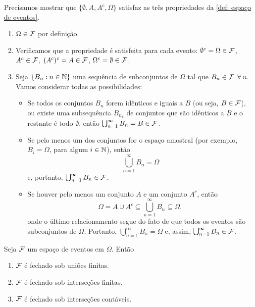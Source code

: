 \begin{solution}
Precisamos mostrar que $\{ \emptyset, A, A^c, \Omega\}$ satisfaz as três propriedades da \ref{def: espaço de eventos}.
\begin{enumerate}
[$ (i) $]
\item $\Omega\in\mathcal F$ por definição.
\item Verificamos que a propriedade é satisfeita para cada evento:  $\emptyset^c=\Omega \in \mathcal F$, $A^c \in \mathcal F$, $(A^c)^c=A \in \mathcal F$,
$\Omega^c=\emptyset \in \mathcal F$.
\item Seja $\{B_n:n\in \mathbb{N}\}$ uma sequência de subconjuntos de $\Omega$ tal que $B_n \in \mathcal F$ $\forall \, n$. Vamos considerar todas as possibilidades:
\begin{itemize}
\item Se todos os conjuntos $B_n$ forem idênticos e iguais a $B$ (ou seja, $B\in\mathcal F$), ou existe uma subsequência $B_{n_k}$ de conjuntos que são idênticos a $B$ e o restante é todo $\emptyset$, então
$\bigcup_{n=1}^\infty B_n = B\in \mathcal F$.
\item Se pelo menos um dos conjuntos for o espaço amostral (por exemplo, $B_i = \Omega$, para algum $i\in\mathbb{N}$), então
\[
\bigcup_{n=1}^\infty B_n = \Omega
\]
e, portanto, $\bigcup_{n=1}^\infty B_n \in \mathcal F$. 
\item Se houver pelo menos um conjunto $A$ e um conjunto $A^c$, então
\[ \Omega = A\cup A^c \subseteq \bigcup_{n=1}^\infty B_n \subseteq \Omega,\]
onde o último relacionamento segue do fato de que todos os eventos são subconjuntos de $\Omega$. Portanto, $\bigcup_{n=1}^\infty B_n = \Omega$ e, assim, $\bigcup_{n=1}^\infty B_n\in \mathcal F$.
\end{itemize}
\end{enumerate}
\end{solution}

\begin{proposition} \label{prop_sigma_prop}
Seja $\mathcal F$ um espaço de eventos em $\Omega$. Então
\begin{enumerate}
\item $\mathcal F$ é fechado sob uniões finitas.
\item $\mathcal F$ é fechado sob interseções finitas.
\item $\mathcal F$ é fechado sob interseções contáveis.
\end{enumerate}
\end{proposition}

